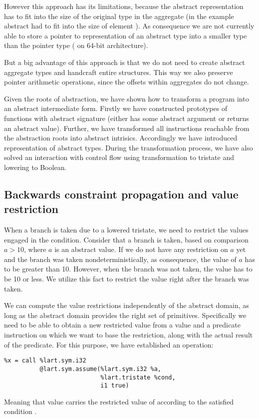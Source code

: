 However this approach has its limitations, because the abstract representation
has to fit into the size of the original type in the aggregate (in the example
abstract  had to fit into the size of element ). As consequence
we are not currently able to store a pointer to representation of an abstract type
into a smaller type than the pointer type ( on 64-bit
architecture).

But a big advantage of this approach is that we do not need to create
abstract aggregate types and handcraft entire structures. This way we also
preserve pointer arithmetic operations, since the offsets within
aggregates do not change.

\begin{summary}
Given the roots of abstraction, we have shown how to transform a program into an
abstract intermediate form. Firstly we have constructed prototypes of
functions with abstract signature (either has some abstract argument or
returns an abstract value). Further, we have transformed all instructions
reachable from the abstraction roots into abstract intrisics. Accordingly we
have introduced representation of abstract types. During the transformation
process, we have also solved an interaction with control flow using
transformation to tristate and lowering to \LLVM Boolean.
\end{summary}

\subsection{Backwards constraint propagation and value restriction}
\label{sec:bcp}
When a branch is taken due to a lowered tristate, we need to restrict the values
engaged in the condition. Consider that a branch is taken, based on comparison $a
> 10$, where $a$ is an abstract value. If we do not have any restriction on $a$
yet and the branch was taken nondeterministically, as consequence, the value of $a$
has to be greater than 10. However, when the branch was not taken,
the value has to be 10 or less. We utilize this fact to restrict the value
right after the branch was taken.

We can compute the value restrictions independently of the abstract domain, as
long as the abstract domain provides the right set of primitives. Specifically we
need to be able to obtain a new restricted value from a value and a predicate
instruction on which we want to base the restriction, along with the actual
result of the predicate. For this purpose, we have established
an  operation:
\begin{verbatim}
%x = call %lart.sym.i32
          @lart.sym.assume(%lart.sym.i32 %a,
                           %lart.tristate %cond,
                           i1 true)
\end{verbatim}
Meaning that value  carries the restricted value of 
according to the satisfied condition .

